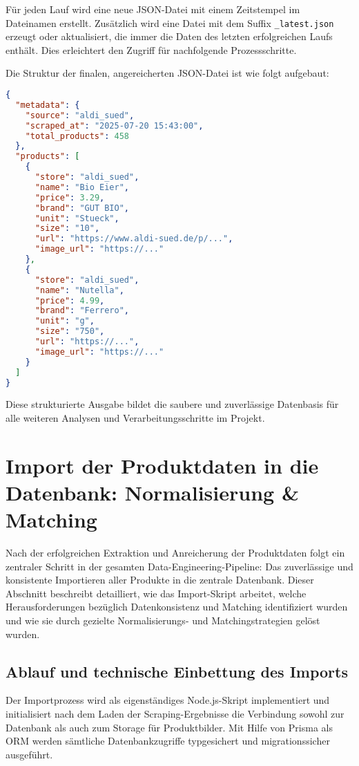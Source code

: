 \documentclass[12pt, a4paper]{report} %
\begin{document}
Für jeden Lauf wird eine neue JSON-Datei mit einem Zeitstempel im Dateinamen erstellt. Zusätzlich wird eine Datei mit dem Suffix \texttt{\_latest.json} erzeugt oder aktualisiert, die immer die Daten des letzten erfolgreichen Laufs enthält. Dies erleichtert den Zugriff für nachfolgende Prozessschritte.

Die Struktur der finalen, angereicherten JSON-Datei ist wie folgt aufgebaut:
\begin{lstlisting}[language=JSON, caption={Beispielhafte JSON-Struktur der finalen Ausgabedatei}]
{
  "metadata": {
    "source": "aldi_sued",
    "scraped_at": "2025-07-20 15:43:00",
    "total_products": 458
  },
  "products": [
    {
      "store": "aldi_sued",
      "name": "Bio Eier",
      "price": 3.29,
      "brand": "GUT BIO",
      "unit": "Stueck",
      "size": "10",
      "url": "https://www.aldi-sued.de/p/...",
      "image_url": "https://..."
    },
    {
      "store": "aldi_sued",
      "name": "Nutella",
      "price": 4.99,
      "brand": "Ferrero",
      "unit": "g",
      "size": "750",
      "url": "https://...",
      "image_url": "https://..."
    }
  ]
}
\end{lstlisting}
Diese strukturierte Ausgabe bildet die saubere und zuverlässige Datenbasis für alle weiteren Analysen und Verarbeitungsschritte im Projekt.

\section{Import der Produktdaten in die Datenbank: Normalisierung \& Matching}

Nach der erfolgreichen Extraktion und Anreicherung der Produktdaten folgt ein zentraler Schritt in der gesamten Data-Engineering-Pipeline: Das zuverlässige und konsistente Importieren aller Produkte in die zentrale Datenbank. Dieser Abschnitt beschreibt detailliert, wie das Import-Skript arbeitet, welche Herausforderungen bezüglich Datenkonsistenz und Matching identifiziert wurden und wie sie durch gezielte Normalisierungs- und Matchingstrategien gelöst wurden.

\subsection{Ablauf und technische Einbettung des Imports}

Der Importprozess wird als eigenständiges Node.js-Skript implementiert und initialisiert nach dem Laden der Scraping-Ergebnisse die Verbindung sowohl zur Datenbank als auch zum Storage für Produktbilder. Mit Hilfe von Prisma als ORM werden sämtliche Datenbankzugriffe typgesichert und migrationssicher ausgeführt.
\end{document}
